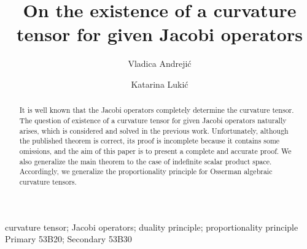 \documentclass[preprint]{elsarticle}
\begin{document}
\begin{frontmatter}

\title{On the existence of a curvature tensor for given Jacobi operators}


\author[matf]{Vladica Andreji\'c}
\author[matf]{Katarina Luki\'c}

\address[matf]{Faculty of Mathematics, University of Belgrade, Belgrade, Serbia}





\begin{abstract}
It is well known that the Jacobi operators completely determine the curvature tensor.
The question of existence of a curvature tensor for given Jacobi operators naturally arises, which is considered and solved in the previous work.
Unfortunately, although the published theorem is correct, its proof is incomplete because it contains some omissions, 
and the aim of this paper is to present a complete and accurate proof.
We also generalize the main theorem to the case of indefinite scalar product space.
Accordingly, we generalize the proportionality principle for Osserman algebraic curvature tensors.
\end{abstract}

\begin{keyword}
curvature tensor; Jacobi operators; duality principle; proportionality principle
\MSC[2020] Primary 53B20; Secondary 53B30
\end{keyword}

\end{frontmatter}

\end{document}
